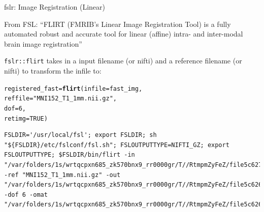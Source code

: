 \documentclass[11pt]{beamer}\usepackage[]{graphicx}\usepackage[]{color}
\makeatletter
\newcommand{\hlnum}[1]{\textcolor[rgb]{0.686,0.059,0.569}{#1}}%
\newcommand{\hlstr}[1]{\textcolor[rgb]{0.192,0.494,0.8}{#1}}%
\newcommand{\hlstd}[1]{\textcolor[rgb]{0.345,0.345,0.345}{#1}}%
\newcommand{\hlkwb}[1]{\textcolor[rgb]{0.69,0.353,0.396}{#1}}%
\newcommand{\hlkwc}[1]{\textcolor[rgb]{0.333,0.667,0.333}{#1}}%
\newcommand{\hlkwd}[1]{\textcolor[rgb]{0.737,0.353,0.396}{\textbf{#1}}}%
\newenvironment{kframe}{%
 \def\at@end@of@kframe{}%
 \ifinner\ifhmode%
  \def\at@end@of@kframe{\end{minipage}}%
  \begin{minipage}{\columnwidth}%
 \fi\fi%
 \def\FrameCommand##1{\hskip\@totalleftmargin \hskip-\fboxsep
 \colorbox{shadecolor}{##1}\hskip-\fboxsep
     \hskip-\linewidth \hskip-\@totalleftmargin \hskip\columnwidth}%
 \MakeFramed {\advance\hsize-\width
   \@totalleftmargin\z@ \linewidth\hsize
   \@setminipage}}%
 {\par\unskip\endMakeFramed%
 \at@end@of@kframe}
\newenvironment{knitrout}{}{} %
\makeatother
\begin{document}
\begin{frame}[fragile]{fslr: Image Registration (Linear)}

From FSL: ``FLIRT (FMRIB's Linear Image Registration Tool) is a fully automated robust and accurate tool for linear (affine) intra- and inter-modal brain image registration''

\verb|fslr::flirt| takes in a input filename (or nifti) and a reference filename (or nifti) to transform the infile to:
\begin{knitrout}
\color{fgcolor}\begin{kframe}
\begin{alltt}
\hlstd{registered_fast} \hlkwb{=} \hlkwd{flirt}\hlstd{(}\hlkwc{infile}\hlstd{=fast_img,}
        \hlkwc{reffile} \hlstd{=} \hlstr{"MNI152_T1_1mm.nii.gz"}\hlstd{,}
        \hlkwc{dof} \hlstd{=} \hlnum{6}\hlstd{,}
        \hlkwc{retimg} \hlstd{=} \hlnum{TRUE}\hlstd{)}
\end{alltt}
\begin{verbatim}
FSLDIR='/usr/local/fsl'; export FSLDIR; sh "${FSLDIR}/etc/fslconf/fsl.sh"; FSLOUTPUTTYPE=NIFTI_GZ; export FSLOUTPUTTYPE; $FSLDIR/bin/flirt -in "/var/folders/1s/wrtqcpxn685_zk570bnx9_rr0000gr/T//RtmpmZyFeZ/file5c6273a91b69.nii.gz" -ref "MNI152_T1_1mm.nii.gz" -out "/var/folders/1s/wrtqcpxn685_zk570bnx9_rr0000gr/T//RtmpmZyFeZ/file5c62685441c1" -dof 6 -omat "/var/folders/1s/wrtqcpxn685_zk570bnx9_rr0000gr/T//RtmpmZyFeZ/file5c626346c5d1.mat"  
\end{verbatim}
\end{kframe}
\end{knitrout}
\end{frame}
\end{document}
